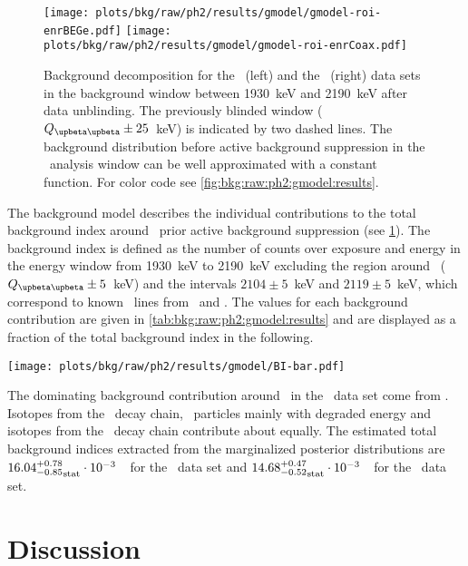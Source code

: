 \begin{figure}
  \centering
  \texttt{[image: plots/bkg/raw/ph2/results/gmodel/gmodel-roi-enrBEGe.pdf]}
  \hspace{12pt}
  \texttt{[image: plots/bkg/raw/ph2/results/gmodel/gmodel-roi-enrCoax.pdf]}
  \caption{%
    Background decomposition for the \enrBEGeII\ (left) and the \enrCoaxII\ (right) data
    sets in the background window between 1930~keV and 2190~keV after data unblinding. The
    previously blinded window ($\qbbM \pm 25$~keV) is indicated by two dashed lines.  The
    background distribution before active background suppression in the \onbb\ analysis
    window can be well approximated with a constant function. For color code see
    \cref{fig:bkg:raw:ph2:gmodel:results}.%
  }\label{fig:bkg:raw:ph2:gmodel:results:roi}
\end{figure}

The background model describes the individual contributions to the total background index
around \qbb\ prior active background suppression (see
\cref{fig:bkg:raw:ph2:gmodel:results:roi}).  The background index is defined as the number
of counts over exposure and energy in the energy window from 1930~keV to 2190~keV
excluding the region around \qbb\ ($\qbbM \pm 5$~keV) and the intervals $2104 \pm 5$~keV
and $2119 \pm 5$~keV, which correspond to known \g\ lines from \Tl\ and \Bih. The values
for each background contribution are given in \cref{tab:bkg:raw:ph2:gmodel:results} and
are displayed as a fraction of the total background index in the following.
\begin{center}
  \texttt{[image: plots/bkg/raw/ph2/results/gmodel/BI-bar.pdf]}
\end{center}
The dominating background contribution around \qbb\ in the \enrBEGeII\ data set come from
\kvz. Isotopes from the \Thh\ decay chain, \a\ particles mainly with degraded energy and
isotopes from the \Uh\ decay chain contribute about equally. The estimated total
background indices extracted from the marginalized posterior distributions are
${16.04^{+0.78}_{-0.85}}_\text{stat} \cdot 10^{-3}$~\ctsper\ for the \enrBEGeII\ data set and
${14.68^{+0.47}_{-0.52}}_\text{stat} \cdot 10^{-3}$~\ctsper\ for the \enrCoaxII\ data set.

\section{Discussion}%
\label{sec:bkg:raw:ph2:discussion}

